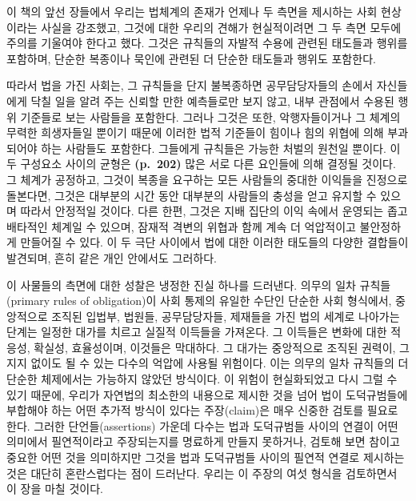 이 책의 앞선 장들에서 우리는 법체계의 존재가 언제나 두 측면을 제시하는
사회 현상이라는 사실을 강조했고, 그것에 대한 우리의 견해가 현실적이려면
그 두 측면 모두에 주의를 기울여야 한다고 했다. 그것은 규칙들의 자발적
수용에 관련된 태도들과 행위를 포함하며, 단순한 복종이나 묵인에 관련된 더
단순한 태도들과 행위도 포함한다.

따라서 법을 가진 사회는, 그 규칙들을 단지 불복종하면 공무담당자들의
손에서 자신들에게 닥칠 일을 알려 주는 신뢰할 만한 예측들로만 보지 않고,
내부 관점에서 수용된 행위 기준들로 보는 사람들을 포함한다. 그러나 그것은
또한, 악행자들이거나 그 체계의 무력한 희생자들일 뿐이기 때문에 이러한
법적 기준들이 힘이나 힘의 위협에 의해 부과되어야 하는 사람들도 포함한다.
그들에게 규칙들은 가능한 처벌의 원천일 뿐이다. 이 두 구성요소 사이의
균형은 \textbf{(p.~202)} 많은 서로 다른 요인들에 의해 결정될 것이다. 그
체계가 공정하고, 그것이 복종을 요구하는 모든 사람들의 중대한 이익들을
진정으로 돌본다면, 그것은 대부분의 시간 동안 대부분의 사람들의 충성을
얻고 유지할 수 있으며 따라서 안정적일 것이다. 다른 한편, 그것은 지배
집단의 이익 속에서 운영되는 좁고 배타적인 체계일 수 있으며, 잠재적
격변의 위협과 함께 계속 더 억압적이고 불안정하게 만들어질 수 있다. 이 두
극단 사이에서 법에 대한 이러한 태도들의 다양한 결합들이 발견되며, 흔히
같은 개인 안에서도 그러하다.

이 사물들의 측면에 대한 성찰은 냉정한 진실 하나를 드러낸다. 의무의 일차
규칙들(primary rules of obligation)이 사회 통제의 유일한 수단인 단순한
사회 형식에서, 중앙적으로 조직된 입법부, 법원들, 공무담당자들, 제재들을
가진 법의 세계로 나아가는 단계는 일정한 대가를 치르고 실질적 이득들을
가져온다. 그 이득들은 변화에 대한 적응성, 확실성, 효율성이며, 이것들은
막대하다. 그 대가는 중앙적으로 조직된 권력이, 그 지지 없이도 될 수 있는
다수의 억압에 사용될 위험이다. 이는 의무의 일차 규칙들의 더 단순한
체제에서는 가능하지 않았던 방식이다. 이 위험이 현실화되었고 다시 그럴 수
있기 때문에, 우리가 자연법의 최소한의 내용으로 제시한 것을 넘어 법이
도덕규범들에  부합해야 하는 어떤 추가적 방식이 있다는
주장(claim)은 매우 신중한 검토를 필요로 한다. 그러한 단언들(assertions)
가운데 다수는 법과 도덕규범들 사이의 연결이 어떤 의미에서 필연적이라고
주장되는지를 명료하게 만들지 못하거나, 검토해 보면 참이고 중요한 어떤
것을 의미하지만 그것을 법과 도덕규범들 사이의 필연적 연결로 제시하는
것은 대단히 혼란스럽다는 점이 드러난다. 우리는 이 주장의 여섯 형식을
검토하면서 이 장을 마칠 것이다.

